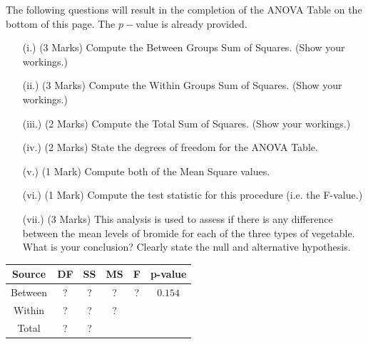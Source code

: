 \documentclass[a4paper,12pt]{article}
\begin{document}
\noindent The following questions will result in the completion of the ANOVA Table on the bottom of this page. The $p-$value is already provided.
\begin{itemize}
	\item[(i.)](3 Marks) Compute the Between Groups Sum of Squares. (Show your workings.)
	\item[(ii.)](3 Marks) Compute the Within Groups Sum of Squares. (Show your workings.)
	\item[(iii.)](2 Marks) Compute the Total Sum of Squares. (Show your workings.)
	\item[(iv.)] (2 Marks) State the degrees of freedom for the ANOVA Table.
	\item[(v.)] (1 Mark) Compute both of the Mean Square values.
	\item[(vi.)] (1 Mark) Compute the test statistic for this procedure (i.e. the F-value.)
	\item[(vii.)] (3 Marks) This analysis is used to assess if there is any difference between the mean levels of bromide for each of the three types of vegetable. What is your conclusion? Clearly state the null and alternative hypothesis.
\end{itemize}
\begin{center}
	\begin{tabular}{|c||c|c|c|c|c|}
		\hline Source & DF & SS & MS & F & p-value \\ \hline 
		\hline Between & \phantom{mak} ? \phantom{mak}  & \phantom{mak} ? \phantom{mak}  & \phantom{mak} ? \phantom{mak}  & \phantom{mak} ? \phantom{mak}  &  $0.154$ \\ 
		\hline Within &  ? & ? & \phantom{mak} ? \phantom{mak}  &  &  \\ 
		\hline \hline Total & ? & ? &  &  &  \\ 
		\hline 
	\end{tabular}
\end{center} 
%
%
%
%



\newpage



%
\end{document}
